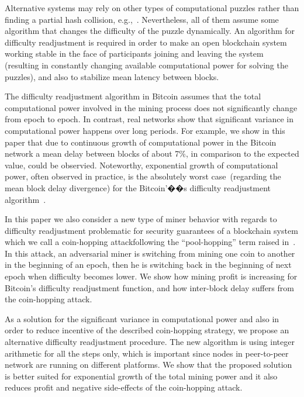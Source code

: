 \documentclass[]{llncs}
\newcommand{\attackname}{coin-hopping attack}
\begin{document}
Alternative systems may rely on other types of computational puzzles rather than finding a partial hash collision, e.g.,~\cite{miller2014permacoin,biryukov2017equihash}. Nevertheless, all of them assume some algorithm that changes the difficulty of the puzzle dynamically. An algorithm for difficulty readjustment is required in order to make an open blockchain system working stable in the face of participants joining and leaving the system (resulting in constantly changing available computational power for solving the puzzles), and also to stabilize mean latency between blocks. 

The difficulty readjustment algorithm in Bitcoin assumes that the total computational power involved in the mining process does not significantly change from epoch to epoch. In contrast, real networks show that significant variance in computational power happens over long periods.
For example, we show in this paper that due to continuous growth of computational power in the Bitcoin network a mean delay between blocks of about 7\%, in comparison to the expected value, could be observied.
Noteworthy, exponential growth of computational power, often observed in practice, is the absolutely worst case~(regarding the mean block delay divergence) for the Bitcoin'��s difficulty readjustment algorithm~\cite{kraft2015difficulty}.
 
In this paper we also consider a new type of miner behavior with regards to difficulty readjustment problematic for security guarantees of a blockchain system which we call a \attackname following the ``pool-hopping'' term raised in~\cite{rosenfeld2011analysis}. In this attack, an adversarial miner is switching from mining one coin to another in the beginning of an epoch, then he is switching back in the beginning of next epoch when difficulty becomes lower. We show how mining profit is increasing for Bitcoin's difficulty readjustment function, and how inter-block delay suffers from the \attackname.

As a solution for the significant variance in computational power and also in order to reduce incentive of the described coin-hopping strategy, we propose an alternative difficulty readjustment procedure. The new algorithm is using integer arithmetic for all the steps only, which is important since nodes in peer-to-peer network are running on different platforms. We show that the proposed solution is better suited for exponential growth of the total mining power and it also reduces profit and negative side-effects of the coin-hopping attack.
\end{document}
